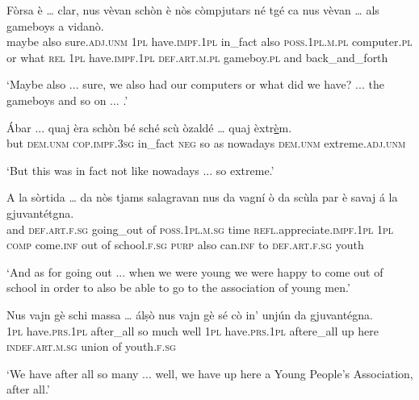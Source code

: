 \begin{linenumbers}
	\gll Fòrsa è … clar, nus vèvan schòn è nòs còmpjutars né tgé ca nus vèvan … als gameboys a vidanò.    \\
	maybe also {} sure.\textsc{adj.unm} \textsc{1pl} have.\textsc{impf.1pl} in\_fact also \textsc{poss.1pl.m.pl} computer.\textsc{pl} or what \textsc{rel} \textsc{1pl} have.\textsc{impf.1pl} {} \textsc{def.art.m.pl} gameboy.\textsc{pl} and back\_and\_forth \\
\end{linenumbers}
\medskip
\glt `Maybe also ... sure, we also had our computers or what did we have? ... the gameboys and so on ... .'
\medskip

\begin{linenumbers}
	\gll  Ábar ... quaj èra schòn bé sché scù òzaldé … quaj èxtr\underline{è}m.   \\
	but {} \textsc{dem.unm} \textsc{cop.impf.3sg} in\_fact \textsc{neg} so as nowadays {} \textsc{dem.unm} extreme.\textsc{adj.unm}\\
\end{linenumbers}
\medskip
\glt `But this was in fact not like nowadays ... so extreme.'
\medskip

\begin{linenumbers}
	\gll A la sòrtida … da nòs tjams salagravan nus da vagní ò da scùla par è savaj á la gjuvantétgna.\\
	and \textsc{def.art.f.sg} going\_out {} of \textsc{ poss.1pl.m.sg} time \textsc{refl}.appreciate.\textsc{impf.1pl} \textsc{1pl} \textsc{comp} come.\textsc{inf} out of school.\textsc{f.sg} \textsc{purp} also can.\textsc{inf} to \textsc{def.art.f.sg} youth\\
\end{linenumbers}
\medskip
\glt `And as for going out ... when we were young we were happy to come out of school in order to also be able to go to the association of young men.'
\medskip

\begin{linenumbers}
	\gll Nus vajn gè schi massa … álṣò nus vajn gè sé cò in’ unjún da gjuvantégna. \\
\textsc{1pl} have.\textsc{prs.1pl} after\_all so much {} well \textsc{1pl} have.\textsc{prs.1pl} aftere\_all up here \textsc{indef.art.m.sg} union of youth.\textsc{f.sg}	\\
\end{linenumbers}
\medskip
\glt `We have after all so many ... well, we have up here a Young People's Association, after all.'
\medskip



